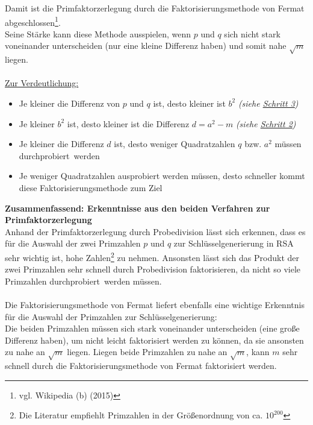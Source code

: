 Damit ist die Primfaktorzerlegung durch die Faktorisierungsmethode von Fermat abgeschlossen\footnote{vgl. Wikipedia (b) (2015)}.\\
Seine Stärke kann diese Methode ausspielen, wenn $p$ und $q$ sich nicht stark voneinander unterscheiden (nur eine kleine Differenz haben) und somit nahe $\sqrt{m}$ liegen.\\
\\
\underline{Zur Verdeutlichung:}
\begin{itemize}
\item Je kleiner die Differenz von $p$ und $q$ ist, desto kleiner ist $b^{2}$ \quad \textit{(siehe \underline{Schritt 3})}
\item Je kleiner $b^{2}$ ist, desto kleiner ist die Differenz $d=a^{2}-m$ \quad \textit{(siehe \underline{Schritt 2})}
\item Je kleiner die Differenz $d$ ist, desto weniger Quadratzahlen $q$ bzw. $a^{2}$ müssen \glqq durchprobiert\grqq~werden
\item Je weniger Quadratzahlen ausprobiert werden müssen, desto schneller kommt diese Faktorisierungsmethode zum Ziel
\end{itemize}  
\textbf{Zusammenfassend: Erkenntnisse aus den beiden Verfahren zur Primfaktorzerlegung}\\
Anhand der Primfaktorzerlegung durch Probedivision lässt sich erkennen, dass es für die Auswahl der zwei Primzahlen $p$ und $q$ zur Schlüsselgenerierung in RSA sehr wichtig ist, hohe Zahlen\footnote{Die Literatur empfiehlt Primzahlen in der Größenordnung von ca. $10^{200}$} zu nehmen. Ansonsten lässt sich das Produkt der zwei Primzahlen sehr schnell durch Probedivision faktorisieren, da nicht so viele Primzahlen \glqq durchprobiert\grqq~werden müssen.\\
\\
Die Faktorisierungsmethode von Fermat liefert ebenfalls eine wichtige Erkenntnis für die Auswahl der Primzahlen zur Schlüsselgenerierung:\\
Die beiden Primzahlen müssen sich stark voneinander unterscheiden (eine große Differenz haben), um nicht leicht faktorisiert werden zu können, da sie ansonsten zu nahe an $\sqrt{m}$ liegen.
Liegen beide Primzahlen zu nahe an $\sqrt{m}$, kann $m$ sehr schnell durch die Faktorisierungsmethode von Fermat faktorisiert werden.

